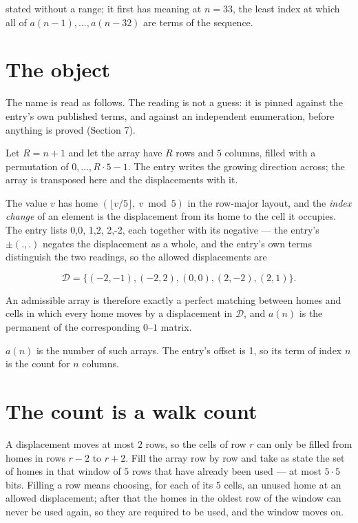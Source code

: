 \documentclass[11pt]{article}
\theoremstyle{definition}
\begin{document}
stated without a range; it first has meaning at $n = 33$, the least index at which all of $a(n-1),\dots,a(n-32)$ are terms of the sequence.

\section{The object}

The name is read as follows. The reading is not a guess: it is pinned against the entry's own published terms, and against an independent enumeration, before anything is proved (Section 7).

Let $R = n + 1$ and let the array have $R$ rows and $5$ columns, filled with a permutation of $0,\dots,R\cdot5-1$. The entry writes the growing direction across; the array is transposed here and the displacements with it.

The value $v$ has home $(\lfloor v/5\rfloor,\ v \bmod 5)$ in the row-major layout, and the {\itshape index change} of an element is the displacement from its home to the cell it occupies. The entry lists 0,0, 1,2, 2,-2, each together with its negative --- the entry's $\pm(.,.)$ negates the displacement as a whole, and the entry's own terms distinguish the two readings, so the allowed displacements are

\[\mathcal{D} = \{(-2,-1), (-2,2), (0,0), (2,-2), (2,1)\}.\]

An admissible array is therefore exactly a perfect matching between homes and cells in which every home moves by a displacement in $\mathcal{D}$, and $a(n)$ is the permanent of the corresponding $0$--$1$ matrix.

$a(n)$ is the number of such arrays. The entry's offset is 1, so its term of index $n$ is the count for $n$ columns.

\section{The count is a walk count}

A displacement moves at most $2$ rows, so the cells of row $r$ can only be filled from homes in rows $r-2$ to $r+2$. Fill the array row by row and take as state the set of homes in that window of $5$ rows that have already been used --- at most $5\cdot5$ bits. Filling a row means choosing, for each of its $5$ cells, an unused home at an allowed displacement; after that the homes in the oldest row of the window can never be used again, so they are required to be used, and the window moves on.
\end{document}
